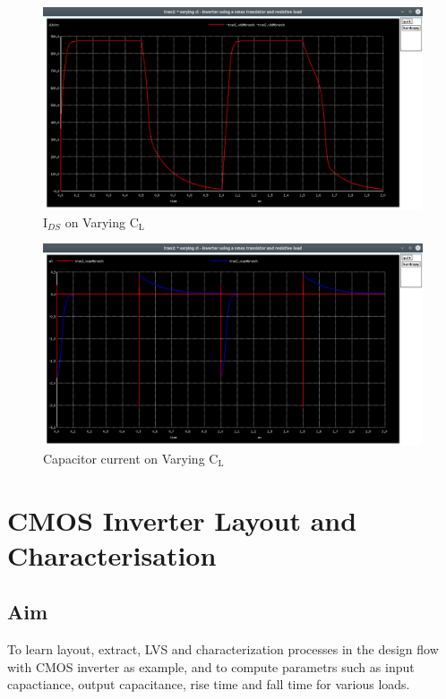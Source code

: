 \documentclass[12pt]{article}
\begin{document}
	\begin{figure}[H]
		\begin{center}
			\includegraphics[scale=0.25]{images/inverter_cl_vdd.png}
			\caption{$\text{I}_{DS}$ on Varying $\text{C}_\text{L}$}
			\label{fig::varying_cl_vdd}
		\end{center}
	\end{figure}
	\begin{figure}[H]
		\begin{center}
			\includegraphics[scale=0.25]{images/inverter_cl_vcap.png}
			\caption{Capacitor current on Varying $\text{C}_\text{L}$}
			\label{fig::varying_cl_vcap}
		\end{center}
	\end{figure}

	
	
	
    
    
    \newpage
	\section{CMOS Inverter Layout and Characterisation} 
	\subsection{Aim}
	To learn layout, extract, LVS and characterization processes in the design flow with CMOS inverter as example, and to compute parametrs such as input capactiance, output capacitance, rise time and fall time for various loads.
\end{document}

